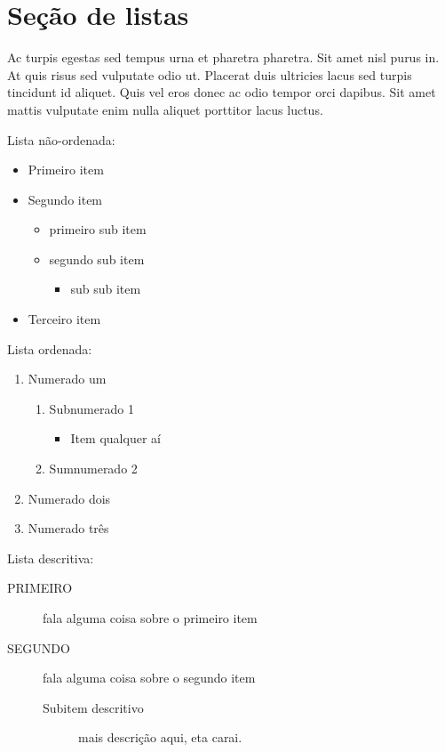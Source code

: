 \documentclass[12pt]{article}
\begin{document}
	\newpage
	\pagecolor{white} %
	\section{Seção de listas}
		Ac turpis egestas sed tempus urna et pharetra pharetra. Sit amet nisl purus in. At quis risus sed vulputate odio ut. Placerat duis ultricies lacus sed turpis tincidunt id aliquet. Quis vel eros donec ac odio tempor orci dapibus. Sit amet mattis vulputate enim nulla aliquet porttitor lacus luctus. 
		
		Lista não-ordenada:
		\begin{itemize} %
			\item Primeiro item
			\item Segundo item
				\begin{itemize}
					\item primeiro sub item
					\item segundo sub item
						\begin{itemize}
							\item sub sub item
						\end{itemize}
				\end{itemize}
			\item Terceiro item
		\end{itemize}
		
		Lista ordenada:
		\begin{enumerate}
			\item Numerado um
				\begin{enumerate}
					\item Subnumerado 1
						\begin{itemize}
							\item Item qualquer aí
						\end{itemize}
					\item Sumnumerado 2
				\end{enumerate}
			\item Numerado dois
			\item Numerado três
		\end{enumerate}
	
		Lista descritiva:
		\begin{description}
			\item[PRIMEIRO] fala alguma coisa sobre o primeiro item
			\item[SEGUNDO] fala alguma coisa sobre o segundo item
				\begin{description}
					\item[Subitem descritivo] mais descrição aqui, eta carai.
				\end{description}
		\end{description}
	\newpage
	
\end{document}
